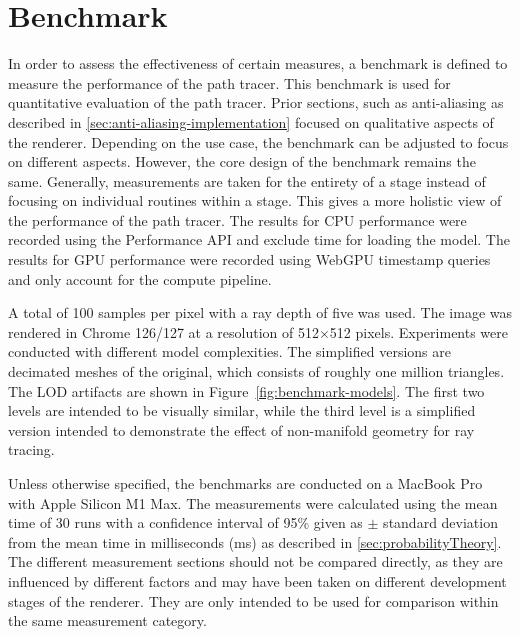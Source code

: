 \section{Benchmark}
\label{sec:benchmark}

In order to assess the effectiveness of certain measures, a benchmark is defined to measure the performance of the path tracer. This benchmark is used for quantitative evaluation of the path tracer. Prior sections, such as anti-aliasing as described in \autoref{sec:anti-aliasing-implementation} focused on qualitative aspects of the renderer. Depending on the use case, the benchmark can be adjusted to focus on different aspects. However, the core design of the benchmark remains the same. Generally, measurements are taken for the entirety of a stage instead of focusing on individual routines within a stage. This gives a more holistic view of the performance of the path tracer. The results for \gls{CPU} performance were recorded using the Performance \gls{API} and exclude time for loading the model. The results for \gls{GPU} performance were recorded using \gls{WebGPU} timestamp queries and only account for the compute pipeline.

A total of 100 samples per pixel with a ray depth of five was used. The image was rendered in Chrome 126/127 at a resolution of 512$\times$512 pixels. Experiments were conducted with different model complexities. The simplified versions are decimated meshes of the original, which consists of roughly one million triangles. The \gls{LOD} artifacts are shown in Figure~\ref{fig:benchmark-models}. The first two levels are intended to be visually similar, while the third level is a simplified version intended to demonstrate the effect of non-manifold geometry for ray tracing.

Unless otherwise specified, the benchmarks are conducted on a MacBook Pro with Apple Silicon M1 Max. The measurements were calculated using the mean time of 30 runs with a confidence interval of 95\% given as $\pm$ standard deviation from the mean time in milliseconds (ms) as described in \autoref{sec:probabilityTheory}. The different measurement sections should not be compared directly, as they are influenced by different factors and may have been taken on different development stages of the renderer. They are only intended to be used for comparison within the same measurement category.

